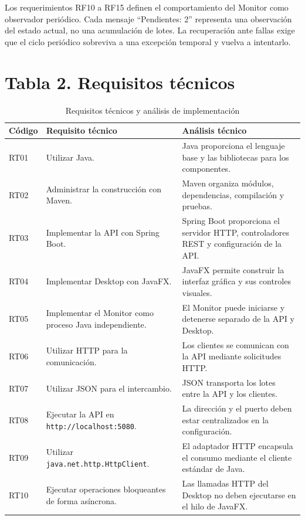 \documentclass[12pt,letterpaper]{article}
\begin{document}
Los requerimientos RF10 a RF15 definen el comportamiento del Monitor como observador periódico. Cada mensaje “Pendientes: 2” representa una observación del estado actual, no una acumulación de lotes. La recuperación ante fallas exige que el ciclo periódico sobreviva a una excepción temporal y vuelva a intentarlo.

\section{Tabla 2. Requisitos técnicos}
\begin{table}[!ht]
\centering
\caption{Requisitos técnicos y análisis de implementación}
\label{tab:tecnicos}
\small\singlespacing
{}
\begin{tabularx}{\textwidth}{@{}P{1.25cm}P{4.05cm}Y@{}}
\toprule
{}\color{white}\textbf{Código} & \color{white}\textbf{Requisito técnico} & \color{white}\textbf{Análisis técnico}\\
\midrule
RT01 & Utilizar Java. & Java proporciona el lenguaje base y las bibliotecas para los componentes.\\
RT02 & Administrar la construcción con Maven. & Maven organiza módulos, dependencias, compilación y pruebas.\\
RT03 & Implementar la API con Spring Boot. & Spring Boot proporciona el servidor HTTP, controladores REST y configuración de la API.\\
RT04 & Implementar Desktop con JavaFX. & JavaFX permite construir la interfaz gráfica y sus controles visuales.\\
RT05 & Implementar el Monitor como proceso Java independiente. & El Monitor puede iniciarse y detenerse separado de la API y Desktop.\\
RT06 & Utilizar HTTP para la comunicación. & Los clientes se comunican con la API mediante solicitudes HTTP.\\
RT07 & Utilizar JSON para el intercambio. & JSON transporta los lotes entre la API y los clientes.\\
RT08 & Ejecutar la API en \texttt{http://localhost:5080}. & La dirección y el puerto deben estar centralizados en la configuración.\\
RT09 & Utilizar \texttt{java.net.http.HttpClient}. & El adaptador HTTP encapsula el consumo mediante el cliente estándar de Java.\\
RT10 & Ejecutar operaciones bloqueantes de forma asíncrona. & Las llamadas HTTP del Desktop no deben ejecutarse en el hilo de JavaFX.\\

\end{tabularx}
\end{table}
\end{document}
